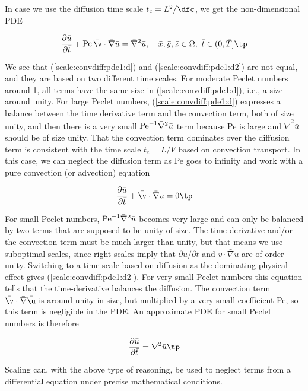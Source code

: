 \documentclass[graybox,envcountchap,sectrefs,final]{svmonodo}
\newenvironment{notice_mdfboxadmon}[1][]{
\begin{notice_mdfboxmdframed}[frametitle=#1]
}
{
\end{notice_mdfboxmdframed}
}
\begin{document}
In case we use the diffusion time scale
$t_c=L^2/\dfc$, we get the non-dimensional PDE

\begin{equation}
\frac{\partial \bar u}{\partial \bar t} +
\hbox{Pe}\,\bar\v\cdot\bar\nabla\bar u =
\bar\nabla^2\bar u,
\quad \bar x,\bar y,\bar z\in \Omega,\ \bar t\in (0,\bar T]\tp
\label{scale:convdiff:pde1:d2}
\end{equation}


\begin{notice_mdfboxadmon}
We see that (\ref{scale:convdiff:pde1:d}) and (\ref{scale:convdiff:pde1:d2})
are not equal, and they are based on two different time scales.
For moderate Peclet numbers around 1, all terms have the same size
in (\ref{scale:convdiff:pde1:d}), i.e., a size around unity.
For large Peclet numbers,
(\ref{scale:convdiff:pde1:d}) expresses a balance
between the time derivative term and the convection term, both of size
unity, and then there is a very small
$\hbox{Pe}^{-1}\bar\nabla^2\bar u$ term because Pe is large and
$\bar\nabla^2\bar u$ should be of size unity.
That the convection term dominates over the diffusion term is
consistent with the time scale $t_c=L/V$ based on convection transport.
In this case, we can neglect the diffusion term as Pe goes to infinity
and work with a pure convection (or advection) equation

\[
\frac{\partial \bar u}{\partial \bar t} +
\bar\v\cdot\bar\nabla\bar u = 0\tp
\]

For small Peclet numbers, $\hbox{Pe}^{-1}\bar\nabla^2\bar u$ becomes
very large and can only be balanced by two terms that are supposed to
be unity of size.  The time-derivative and/or the convection term must
be much larger than unity, but that means we use suboptimal scales,
since right scales imply that $\partial\bar u/\partial\bar t$ and
$\bar v\cdot\bar\nabla\bar u$ are of order unity. Switching to a time
scale based on diffusion as the dominating physical effect gives
(\ref{scale:convdiff:pde1:d2}).  For very small Peclet numbers this
equation tells that the time-derivative balances the diffusion.
The convection term $\bar\v\cdot\bar\nabla\bar\u$ is around
unity in size, but multiplied by a very small coefficient Pe, so this term is
negligible in the PDE. An approximate PDE for small Peclet numbers is
therefore

\[
\frac{\partial \bar u}{\partial \bar t}
= \bar\nabla^2\bar u\tp
\]

Scaling can, with the above type of reasoning, be used
to neglect terms from a differential equation under precise mathematical
conditions.
\end{notice_mdfboxadmon}
\end{document}
